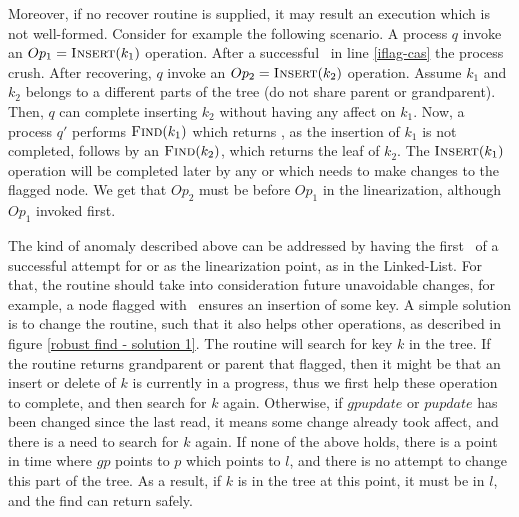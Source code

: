 Moreover, if no recover routine is supplied, it may result an execution which is not well-formed. Consider for example the following scenario. A process $q$ invoke an $Op_1 = \mbox{\sc Insert}(k_1)$ operation. After a successful \CASB\ in line \ref{iflag-cas} the process crush. After recovering, $q$ invoke an $Op_2 = \mbox{\sc Insert}(k_2)$ operation. Assume $k_1$ and $k_2$ belongs to a different parts of the tree (do not share parent or grandparent). Then, $q$ can complete inserting $k_2$ without having any affect on $k_1$. Now, a process $q'$ performs $\mbox{\sc Find}(k_1)$ which returns \NULL, as the insertion of $k_1$ is not completed, follows by an $\mbox{\sc Find}(k_2)$, which returns the leaf of $k_2$. The $\mbox{\sc Insert}(k_1)$ operation will be completed later by any  or  which needs to make changes to the flagged node. We get that $Op_2$ must be before $Op_1$ in the linearization, although $Op_1$ invoked first.

The kind of anomaly described above can be addressed by having the first \CASB\ of a successful attempt for  or  as the linearization point, as in the Linked-List. For that, the  routine should take into consideration future unavoidable changes, for example, a node flagged with \insertflag\ ensures an insertion of some key. A simple solution is to change the  routine, such that it also helps other operations, as described in figure \ref{robust find - solution 1}. The  routine will search for key $k$ in the tree. If the  routine returns grandparent or parent that flagged, then it might be that an insert or delete of $k$ is currently in a progress, thus we first help these operation to complete, and then search for $k$ again. Otherwise, if $gpupdate$ or $pupdate$ has been changed since the last read, it means some change already took affect, and there is a need to search for $k$ again. If none of the above holds, there is a point in time where $gp$ points to $p$ which points to $l$, and there is no attempt to change this part of the tree. As a result, if $k$ is in the tree at this point, it must be in $l$, and the find can return safely. 

